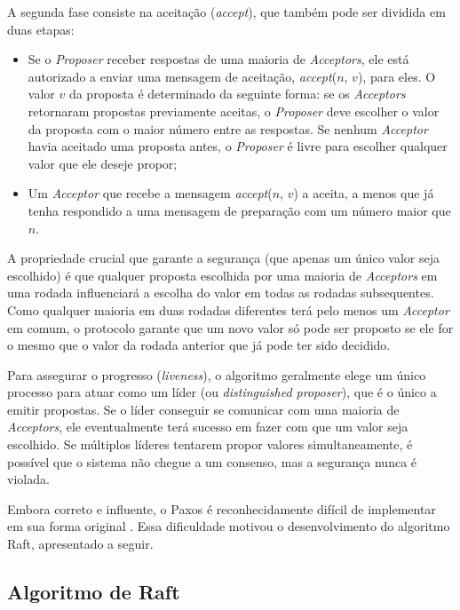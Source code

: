         A segunda fase consiste na aceitação (\textit{accept}), que também pode ser dividida em duas etapas:
        \begin{itemize}
            \item Se o \textit{Proposer} receber respostas de uma maioria de \textit{Acceptors}, ele está autorizado a enviar uma mensagem de aceitação, \textit{accept}($n$, $v$), para eles. O valor $v$ da proposta é determinado da seguinte forma: se os \textit{Acceptors} retornaram propostas previamente aceitas, o \textit{Proposer} deve escolher o valor da proposta com o maior número entre as respostas. Se nenhum \textit{Acceptor} havia aceitado uma proposta antes, o \textit{Proposer} é livre para escolher qualquer valor que ele deseje propor;
            
            \item Um \textit{Acceptor} que recebe a mensagem \textit{accept}($n$, $v$) a aceita, a menos que já tenha respondido a uma mensagem de preparação com um número maior que $n$.
        \end{itemize}

        A propriedade crucial que garante a segurança (que apenas um único valor seja escolhido) é que qualquer proposta escolhida por uma maioria de \textit{Acceptors} em uma rodada influenciará a escolha do valor em todas as rodadas subsequentes. Como qualquer maioria em duas rodadas diferentes terá pelo menos um \textit{Acceptor} em comum, o protocolo garante que um novo valor só pode ser proposto se ele for o mesmo que o valor da rodada anterior que já pode ter sido decidido.

        Para assegurar o progresso (\textit{liveness}), o algoritmo geralmente elege um único processo para atuar como um líder (ou \textit{distinguished proposer}), que é o único a emitir propostas. Se o líder conseguir se comunicar com uma maioria de \textit{Acceptors}, ele eventualmente terá sucesso em fazer com que um valor seja escolhido. Se múltiplos líderes tentarem propor valores simultaneamente, é possível que o sistema não chegue a um consenso, mas a segurança nunca é violada.

        Embora correto e influente, o Paxos é reconhecidamente difícil de implementar em sua forma original \cite{raft2014}. Essa dificuldade motivou o desenvolvimento do algoritmo Raft, apresentado a seguir.

    \subsection{Algoritmo de Raft}

